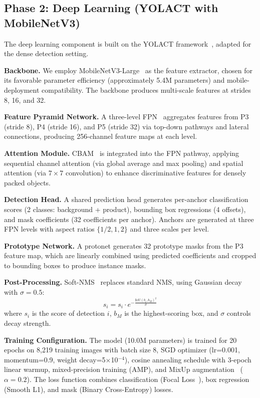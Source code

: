 \documentclass[conference]{IEEEtran}
\begin{document}
\subsection{Phase 2: Deep Learning (YOLACT with MobileNetV3)}
\label{sec:phase2}

The deep learning component is built on the YOLACT
framework~\cite{bolya2019yolact}, adapted for the dense detection setting.

\textbf{Backbone.} We employ MobileNetV3-Large~\cite{howard2019mobilenetv3}
as the feature extractor, chosen for its favorable parameter efficiency
(approximately 5.4M parameters) and mobile-deployment compatibility. The
backbone produces multi-scale features at strides 8, 16, and 32.

\textbf{Feature Pyramid Network.} A three-level FPN~\cite{lin2017fpn}
aggregates features from P3 (stride 8), P4 (stride 16), and P5 (stride 32)
via top-down pathways and lateral connections, producing 256-channel feature
maps at each level.

\textbf{Attention Module.} CBAM~\cite{woo2018cbam} is integrated into the FPN
pathway, applying sequential channel attention (via global average and max
pooling) and spatial attention (via $7 \times 7$ convolution) to enhance
discriminative features for densely packed objects.

\textbf{Detection Head.} A shared prediction head generates per-anchor
classification scores (2 classes: background + product), bounding box
regressions (4 offsets), and mask coefficients (32 coefficients per anchor).
Anchors are generated at three FPN levels with aspect ratios $\{1/2, 1, 2\}$
and three scales per level.

\textbf{Prototype Network.} A protonet generates 32 prototype masks from the
P3 feature map, which are linearly combined using predicted coefficients and
cropped to bounding boxes to produce instance masks.

\textbf{Post-Processing.} Soft-NMS~\cite{bodla2017softnms} replaces standard
NMS, using Gaussian decay with $\sigma = 0.5$:
\begin{equation}
  s_i = s_i \cdot e^{-\frac{\text{IoU}(b_i, b_M)^2}{\sigma}}
\end{equation}
where $s_i$ is the score of detection $i$, $b_M$ is the highest-scoring box,
and $\sigma$ controls decay strength.

\textbf{Training Configuration.} The model (10.0M parameters) is trained for
20 epochs on 8,219 training images with batch size 8, SGD optimizer (lr=0.001,
momentum=0.9, weight decay=5$\times$10$^{-4}$), cosine annealing schedule with
3-epoch linear warmup, mixed-precision training (AMP), and MixUp
augmentation~\cite{zhang2017mixup} ($\alpha = 0.2$). The loss function combines
classification (Focal Loss~\cite{lin2017focal}), box regression (Smooth L1),
and mask (Binary Cross-Entropy) losses.
\end{document}
